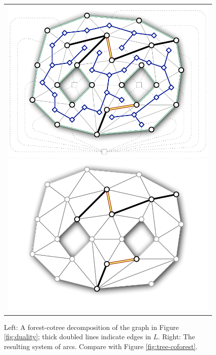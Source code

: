 \documentclass[11pt,twoside]{article}
\begin{document}
\begin{figure}[htb]
\centering\footnotesize\sf
\begin{tabular}{c}
\includegraphics[scale=0.45]{Fig/forest-cotree2} \qquad
\includegraphics[scale=0.45]{Fig/forest-cotree-arcs2}
\end{tabular}
\caption{Left: A forest-cotree decomposition of the graph in Figure \ref{fig:duality}; thick doubled lines indicate edges in $L$.
Right: The resulting system of arcs.  Compare with Figure \ref{fig:tree-coforest}.}
\label{fig:forest-cotree}
\end{figure}
\end{document}
